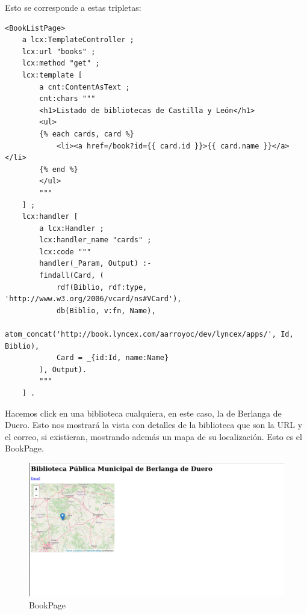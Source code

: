 \documentclass[12pt]{report} %
\begin{document}
Esto se corresponde a estas tripletas:
\begin{lstlisting}
<BookListPage>
    a lcx:TemplateController ;
    lcx:url "books" ;
    lcx:method "get" ;
    lcx:template [
        a cnt:ContentAsText ;
        cnt:chars """
        <h1>Listado de bibliotecas de Castilla y León</h1>
        <ul>
        {% each cards, card %}
            <li><a href=/book?id={{ card.id }}>{{ card.name }}</a></li>
        {% end %}
        </ul>
        """
    ] ;
    lcx:handler [
        a lcx:Handler ;
        lcx:handler_name "cards" ;
        lcx:code """
        handler(_Param, Output) :-
        findall(Card, (
            rdf(Biblio, rdf:type, 'http://www.w3.org/2006/vcard/ns#VCard'),
            db(Biblio, v:fn, Name),
            atom_concat('http://book.lyncex.com/aarroyoc/dev/lyncex/apps/', Id, Biblio),
            Card = _{id:Id, name:Name}
        ), Output).
        """
    ] .
\end{lstlisting}

Hacemos click en una biblioteca cualquiera, en este caso, la de Berlanga de Duero. Esto nos mostrará la vista con detalles de la biblioteca que son la URL y el correo, si existieran, mostrando además un mapa de su localización. Esto es el BookPage.

\begin{figure}
    \centering
    \includegraphics[width=\textwidth]{tour/bibliocyl3.png}
    \caption{BookPage}
    \label{fig:bibliocyl3}
\end{figure}
\end{document}
